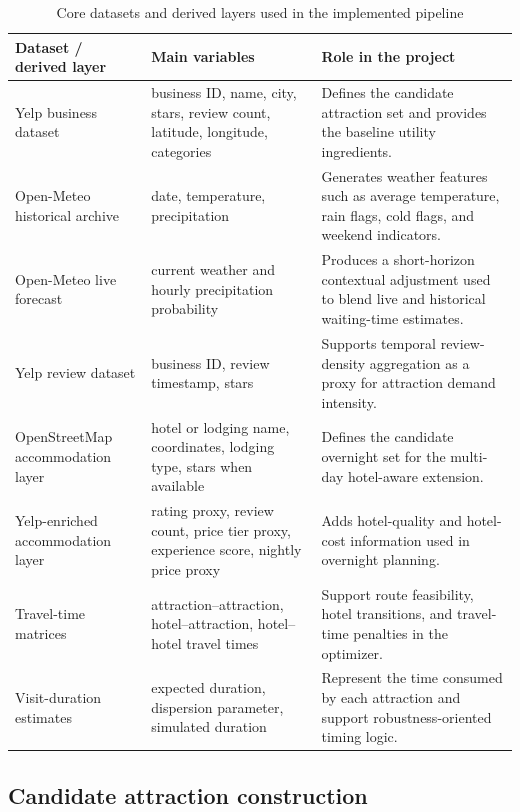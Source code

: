 \documentclass[12pt,a4paper]{article}
\begin{document}
\begin{table}[H]
\centering
\caption{Core datasets and derived layers used in the implemented pipeline}
\begin{threeparttable}
\begin{tabular}{p{3.5cm} p{4.2cm} p{7.0cm}}
\toprule
\textbf{Dataset / derived layer} & \textbf{Main variables} & \textbf{Role in the project} \\
\midrule
Yelp business dataset & business ID, name, city, stars, review count, latitude, longitude, categories & Defines the candidate attraction set and provides the baseline utility ingredients. \\
Open-Meteo historical archive & date, temperature, precipitation & Generates weather features such as average temperature, rain flags, cold flags, and weekend indicators. \\
Open-Meteo live forecast & current weather and hourly precipitation probability & Produces a short-horizon contextual adjustment used to blend live and historical waiting-time estimates. \\
Yelp review dataset & business ID, review timestamp, stars & Supports temporal review-density aggregation as a proxy for attraction demand intensity. \\
OpenStreetMap accommodation layer & hotel or lodging name, coordinates, lodging type, stars when available & Defines the candidate overnight set for the multi-day hotel-aware extension. \\
Yelp-enriched accommodation layer & rating proxy, review count, price tier proxy, experience score, nightly price proxy & Adds hotel-quality and hotel-cost information used in overnight planning. \\
Travel-time matrices & attraction--attraction, hotel--attraction, hotel--hotel travel times & Support route feasibility, hotel transitions, and travel-time penalties in the optimizer. \\
Visit-duration estimates & expected duration, dispersion parameter, simulated duration & Represent the time consumed by each attraction and support robustness-oriented timing logic. \\
\bottomrule
\end{tabular}
\end{threeparttable}
\end{table}

\subsection{Candidate attraction construction}
\end{document}
